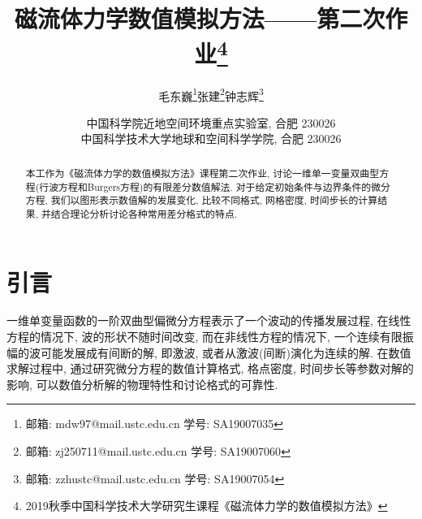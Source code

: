 \documentclass[10.5pt
]{article}
\begin{document}
\renewcommand{\refname}{参考文献}
\renewcommand{\figurename}{图}
\renewcommand{\abstractname}{摘要}

\title{磁流体力学数值模拟方法——第二次作业\footnote{2019秋季中国科学技术大学研究生课程《磁流体力学的数值模拟方法》}}


\author{毛东巍\footnote{邮箱: mdw97@mail.ustc.edu.cn  学号: SA19007035}\quad 张建\footnote{邮箱: zj250711@mail.ustc.edu.cn  学号: SA19007060}\quad 钟志辉\footnote{邮箱: zzhustc@mail.ustc.edu.cn  学号: SA19007054}}

\date{%
	\scriptsize%
	中国科学院近地空间环境重点实验室, 合肥 230026\\
	中国科学技术大学地球和空间科学学院, 合肥 230026
}

\maketitle

\begin{abstract}
本工作为《磁流体力学的数值模拟方法》课程第二次作业, 讨论一维单一变量双曲型方程(行波方程和Burgers方程)的有限差分数值解法. 对于给定初始条件与边界条件的微分方程, 我们以图形表示数值解的发展变化, 比较不同格式, 网格密度, 时间步长的计算结果, 并结合理论分析讨论各种常用差分格式的特点. 
\end{abstract}

\section{引言}
一维单变量函数的一阶双曲型偏微分方程表示了一个波动的传播发展过程, 在线性方程的情况下,
波的形状不随时间改变, 而在非线性方程的情况下, 一个连续有限振幅的波可能发展成有间断的解, 即激波, 或者从激波(间断)演化为连续的解\citep{Whitham1999}. 在数值求解过程中, 通过研究微分方程的数值计算格式, 格点密度, 时间步长等参数对解的影响, 可以数值分析解的物理特性和讨论格式的可靠性.
\end{document}
